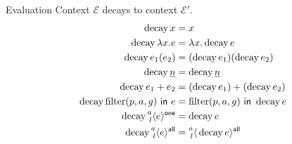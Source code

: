 



 Evaluation Context \(\mathcal{E}\) decays to context \(\mathcal{E}'\).
\[
  \begin{aligned}
    \Decay{x} &= x \\
    \Decay{\Lam{x}{e}} &= \Lam{x}{\Decay{e}} \\
    \Decay{e_1(e_2)} &= (\Decay{e_1})(\Decay{e_2}) \\
    \Decay{\Nat{n}} &= \Decay{\Nat{n}} \\
    \Decay{e_1 + e_2} &= (\Decay{e_1}) + (\Decay{e_2}) \\
    \Decay{\Filter{(p, a, g)}{e}} &= \Filter{(p, a, g)}{\Decay{e}} \\
    \Decay{\Residue{a}{\GasOne}{l}{e}} &= \Decay{e} \\
    \Decay{\Residue{a}{\GasAll}{l}{e}} &= \Residue{a}{\GasAll}{l}{\Decay{e}}
  \end{aligned}
\]


